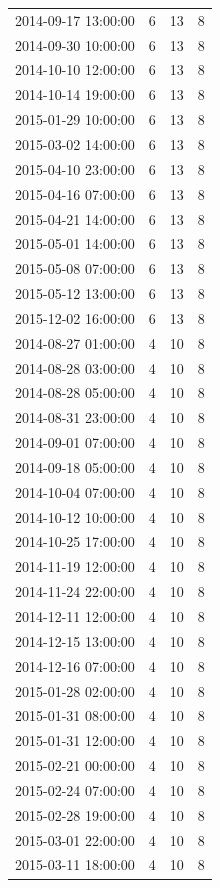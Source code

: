 \begin{tabular}{lrrr}
2014-09-17 13:00:00 & 6 & 13 & 8 \\
2014-09-30 10:00:00 & 6 & 13 & 8 \\
2014-10-10 12:00:00 & 6 & 13 & 8 \\
2014-10-14 19:00:00 & 6 & 13 & 8 \\
2015-01-29 10:00:00 & 6 & 13 & 8 \\
2015-03-02 14:00:00 & 6 & 13 & 8 \\
2015-04-10 23:00:00 & 6 & 13 & 8 \\
2015-04-16 07:00:00 & 6 & 13 & 8 \\
2015-04-21 14:00:00 & 6 & 13 & 8 \\
2015-05-01 14:00:00 & 6 & 13 & 8 \\
2015-05-08 07:00:00 & 6 & 13 & 8 \\
2015-05-12 13:00:00 & 6 & 13 & 8 \\
2015-12-02 16:00:00 & 6 & 13 & 8 \\
2014-08-27 01:00:00 & 4 & 10 & 8 \\
2014-08-28 03:00:00 & 4 & 10 & 8 \\
2014-08-28 05:00:00 & 4 & 10 & 8 \\
2014-08-31 23:00:00 & 4 & 10 & 8 \\
2014-09-01 07:00:00 & 4 & 10 & 8 \\
2014-09-18 05:00:00 & 4 & 10 & 8 \\
2014-10-04 07:00:00 & 4 & 10 & 8 \\
2014-10-12 10:00:00 & 4 & 10 & 8 \\
2014-10-25 17:00:00 & 4 & 10 & 8 \\
2014-11-19 12:00:00 & 4 & 10 & 8 \\
2014-11-24 22:00:00 & 4 & 10 & 8 \\
2014-12-11 12:00:00 & 4 & 10 & 8 \\
2014-12-15 13:00:00 & 4 & 10 & 8 \\
2014-12-16 07:00:00 & 4 & 10 & 8 \\
2015-01-28 02:00:00 & 4 & 10 & 8 \\
2015-01-31 08:00:00 & 4 & 10 & 8 \\
2015-01-31 12:00:00 & 4 & 10 & 8 \\
2015-02-21 00:00:00 & 4 & 10 & 8 \\
2015-02-24 07:00:00 & 4 & 10 & 8 \\
2015-02-28 19:00:00 & 4 & 10 & 8 \\
2015-03-01 22:00:00 & 4 & 10 & 8 \\
2015-03-11 18:00:00 & 4 & 10 & 8 \\

\end{tabular}
